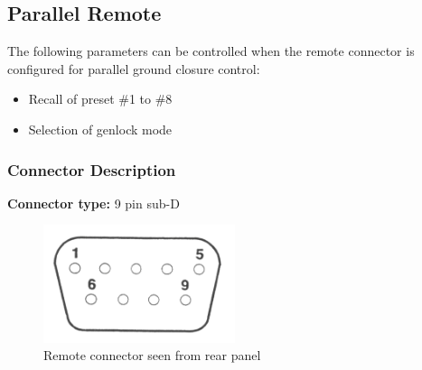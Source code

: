 \subsection{Parallel Remote}

The following parameters can be controlled when the remote connector is configured for parallel
ground closure control:
\begin{itemize}
\item Recall of preset \#1 to \#8
\item Selection of genlock mode
\end{itemize}

\subsubsection{Connector Description}

\textbf{Connector type:}
9 pin sub-D

\begin{figure}[hbt]
\centering
\includegraphics[width=0.5\textwidth]{fig/dsub}
\caption{Remote connector seen from rear panel}
\end{figure}

